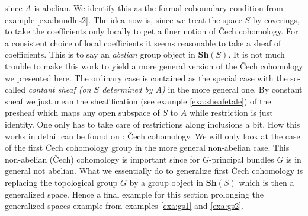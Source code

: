since $A$ is abelian. We identify this as the formal coboundary condition from example \ref{exa:bundles2}. The idea now is, since we treat the space $S$ by coverings, to take the coefficients only locally to get a finer notion of \v{C}ech cohomology. For a consistent choice of local coefficients it seems reasonable to take a sheaf of coefficients. This is to say an \textit{abelian} group object in $\mathbf{Sh}(S)$. It is not much trouble to make this work to yield a more general version of the \v{C}ech cohomology we presented here. The ordinary case is contained as the special case with the so-called \textit{contant sheaf (on $S$ determined by $A$)} in the more general one. By constant sheaf we just mean the sheafification (see example \ref{exa:sheafetale}) of the presheaf which maps any open subspace of $S$ to $A$ while restriction is just identity. One only has to take care of restrictions along inclusions a bit. How this works in detail can be found on \cite{wiki-pedia0en}: \v{C}ech cohomology. We will only look at the case of the first \v{C}ech cohomology group in the more general non-abelian case. This non-abelian (\v{C}ech) cohomology is important since for $G$-principal bundles $G$ is in general not abelian. What we essentially do to generalize first \v{C}ech cohomology is replacing the topological group $G$ by a group object in $\mathbf{Sh}(S)$ which is then a generalized space. Hence a final example for this section prolonging the generalized spaces example from examples \ref{exa:gs1} and \ref{exa:gs2}.
\\
